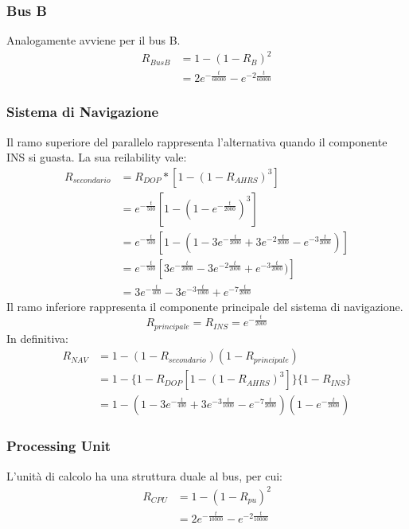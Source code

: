 \subsubsection{Bus B}
Analogamente avviene per il bus B.
\begin{equation*}
	\begin{split}
		R_{BusB} &= 1-(1-R_B)^2 \\
		&= 2e^{-\frac{t}{60000}} - e^{-2\frac{t}{60000}}
	\end{split}
\end{equation*}
\subsubsection{Sistema di Navigazione}
Il ramo superiore del parallelo rappresenta l'alternativa quando il componente INS si guasta. La sua reilability vale:
\begin{equation*}
	\begin{split}
			R_{secondario} &= R_{DOP} * [1-(1-R_{AHRS})^3] \\
			&=e^{-\frac{t}{500}}[1-(1-e^{-\frac{t}{2000}})^3] \\
			&=e^{-\frac{t}{500}}[1-(1 - 3e^{-\frac{t}{2000}} + 3e^{-2\frac{t}{2000}} - e^{-3\frac{t}{2000}})] \\
			&=e^{-\frac{t}{500}}[3e^{-\frac{t}{2000}} - 3e^{-2\frac{t}{2000}} + e^{-3\frac{t}{2000}})] \\
			&= 3e^{-\frac{t}{400}} - 3e^{-3\frac{t}{1000}} + e^{-7\frac{t}{2000}}
	\end{split}
\end{equation*}
Il ramo inferiore rappresenta il componente principale del sistema di navigazione.
\begin{equation*}
	R_{principale} = R_{INS} = e^{-\frac{t}{2000}}
\end{equation*}
In definitiva:
\begin{equation*}
	\begin{split}
	 R_{NAV} &= 1-(1-R_{secondario})(1-R_{principale}) \\
	 &= 1 - \{1-R_{DOP}[1-(1-R_{AHRS})^3]\}\{1- R_{INS}\} \\
	 &= 1 - (1-3e^{-\frac{t}{400}} + 3e^{-3\frac{t}{1000}} - e^{-7\frac{t}{2000}})(1-e^{-\frac{t}{2000}})
	\end{split}
\end{equation*}

\subsubsection{Processing Unit}
L'unità di calcolo ha una struttura duale al bus, per cui:
\begin{equation*}
		\begin{split}
			R_{CPU} &= 1-(1-R_{pu})^2 \\
			&= 2e^{-\frac{t}{10000}} - e^{-2\frac{t}{10000}}
		\end{split}
\end{equation*}

